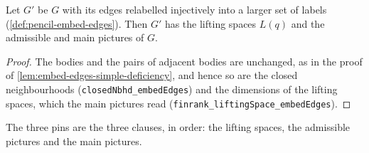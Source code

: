 \begin{lemma}
  \label{lem:pencil-jj-embed-edges}
  \leanok
  Let $G'$ be $G$ with its edges relabelled injectively into a larger set
  of labels (\cref{def:pencil-embed-edges}). Then $G'$ has the lifting
  spaces $L(q)$ and the admissible and main pictures of $G$.
\end{lemma}
\begin{proof}
  \leanok
  The bodies and the pairs of adjacent bodies are unchanged, as in the
  proof of \cref{lem:embed-edges-simple-deficiency}, and hence so are the
  closed neighbourhoods (\texttt{closedNbhd\_\allowbreak{}embedEdges})
  and the dimensions of the lifting spaces, which the main pictures read
  (\texttt{finrank\_\allowbreak{}liftingSpace\_\allowbreak{}embedEdges}).
\end{proof}

\begin{fmlnote}
  The three pins are the three clauses, in order: the lifting spaces, the
  admissible pictures and the main pictures.
\end{fmlnote}

